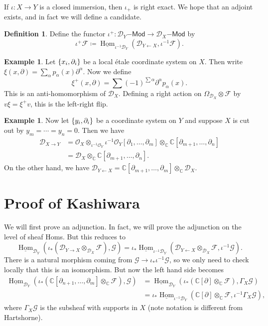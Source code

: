 \documentclass[leqno, openany]{memoir}
\theoremstyle{definition}
\newtheorem{defn}[thm]{Definition}
\newtheorem{exm}[thm]{Example}
\theoremstyle{remark}
\theoremstyle{plain}
\theoremstyle{definition}
\theoremstyle{remark}
\newcommand{\C}{\mathbb{C}}
\newcommand{\mc}[1]{\mathcal{#1}}
\newcommand{\ms}[1]{\mathsf{#1}}
\newcommand{\ul}[1]{\underline{#1}}
\DeclareMathOperator{\Hom}{Hom}
\begin{document}
If $\iota \colon X \to Y$ is a closed immersion, then $\iota_+$ is right exact. We hope that an adjoint exists, and in fact we will define a candidate.
\begin{defn}
    Define the functor $\iota^+ \colon \mc{D}_Y\ms{-Mod} \to \mc{D}_X\ms{-Mod}$ by
    \[ \iota^+ \mc{F} \coloneqq \ul{\Hom}_{\iota^{-1} \mc{D}_Y} (\mc{D}_{Y \gets X}, \iota^{-1} \mc{F}). \]
\end{defn}

\begin{exm}
    Let $\qty{x_i, \partial_i}$ be a local \'etale coordinate system on $X$. Then write $\xi(x, \partial) = \sum_{\alpha} p_{\alpha}(x) \partial^{\alpha}$. Now we define
    \[ \xi^+(x, \partial) = \sum (-1)^{\sum \alpha} \partial^{\alpha} p_{\alpha}(x). \]
    This is an anti-homomorphism of $\mc{D}_X$. Defining a right action on $\Omega_{\mc{D}_X} \otimes \mc{F}$ by $v \xi = \xi^+ v$, this is the left-right flip.
\end{exm}

\begin{exm}
    Now let $\qty{y_i, \partial_i}$ be a coordinate system on $Y$ and suppose $X$ is cut out by $y_m = \cdots = y_n = 0$. Then we have
    \begin{align*}
        \mc{D}_{X \to Y} &= \mc{O}_X \otimes_{\iota^{-1} \mc{O}_Y} \iota^{-1} \mc{O}_Y[\partial_1, \ldots, \partial_m] \otimes_{\C} \C[\partial_{m+1}, \ldots, \partial_{n}] \\
        &= \mc{D}_X \otimes_{\C} \C[\partial_{m+1}, \ldots, \partial_n].
    \end{align*}
    On the other hand, we have $\mc{D}_{Y \gets X} = \C[\partial_{m+1}, \ldots, \partial_m] \otimes_{\C} \mc{D}_X$.
\end{exm}

\section{Proof of Kashiwara}
    We will first prove an adjunction. In fact, we will prove the adjunction on the level of sheaf Homs. But this reduces to
    \[ \ul{\Hom}_{\mc{D}_Y}(\iota_* (\mc{D}_{Y \to X} \otimes_{\mc{D}_X} \mc{F}), \mc{G}) = \iota_* \ul{\Hom}_{\iota^{-1} \mc{D}_Y}(\mc{D}_{Y \gets X} \otimes_{\mc{D}_X} \mc{F}, \iota^{-1} \mc{G}). \]
    There is a natural morphism coming from $\mc{G} \to \iota_* \iota^{-1} \mc{G}$, so we only need to check locally that this is an isomorphism. But now the left hand side becomes 
    \begin{align*}
        \ul{\Hom}_{\mc{D}_Y} (\iota_* (\C[\partial_{n+1}, \ldots, \partial_m] \otimes_{\C} \mc{F}), \mc{G}) &= \ul{\Hom}_{\mc{D}_Y}(\iota_* (\C[\partial] \otimes_{\C} \mc{F}), \Gamma_X \mc{G}) \\
        &= \iota_* \ul{\Hom}_{\iota^{-1} \mc{D}_Y} (\C[\partial] \otimes_{\C} \mc{F}, \iota^{-1} \Gamma_X \mc{G}),
    \end{align*}
    where $\Gamma_X \mc{G}$ is the subsheaf with supports in $X$ (note notation is different from Hartshorne).
\end{document}

